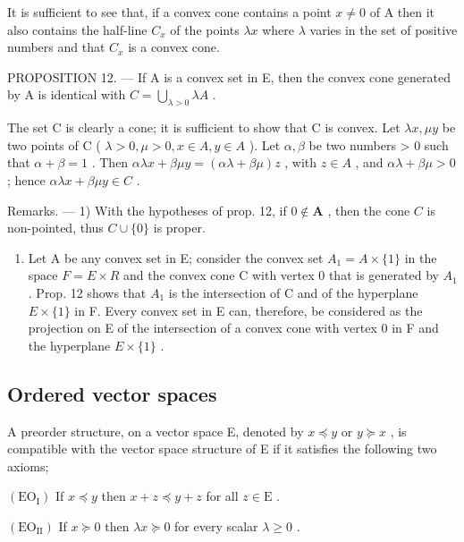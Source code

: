 It is sufficient to see that, if a convex cone contains a point \(x \neq 0\) of A then it also contains the half-line \(C_{x}\) of the points \(\lambda x\) where \(\lambda\) varies in the set of positive numbers and that \(C_{x}\) is a convex cone.

PROPOSITION 12. --- If A is a convex set in E, then the convex cone generated by A is identical with \(C = \bigcup_{\lambda > 0} \lambda A\) .

The set C is clearly a cone; it is sufficient to show that C is convex. Let \(\lambda x, \mu y\) be two points of C ( \(\lambda > 0, \mu > 0, x \in A, y \in A\) ). Let \(\alpha, \beta\) be two numbers \textgreater{} 0 such that \(\alpha + \beta = 1\) . Then \(\alpha \lambda x + \beta \mu y = (\alpha \lambda + \beta \mu) z\) , with \(z \in A\) , and \(\alpha \lambda + \beta \mu > 0\) ; hence \(\alpha \lambda x + \beta \mu y \in C\) .

Remarks. --- 1) With the hypotheses of prop. 12, if \(0 \notin \mathbf{A}\) , then the cone \(C\) is non-pointed, thus \(C \cup \{0\}\) is proper.

\begin{enumerate}
\def\labelenumi{\arabic{enumi})}
\setcounter{enumi}{1}
\tightlist
\item
  Let A be any convex set in E; consider the convex set \(A_{1} = A \times \{1\}\) in the space \(F = E \times R\) and the convex cone C with vertex 0 that is generated by \(A_{1}\) . Prop. 12 shows that \(A_{1}\) is the intersection of C and of the hyperplane \(E \times \{1\}\) in F. Every convex set in E can, therefore, be considered as the projection on E of the intersection of a convex cone with vertex 0 in F and the hyperplane \(E \times \{1\}\) .
\end{enumerate}

\subsection{Ordered vector spaces}

A preorder structure, on a vector space E, denoted by \(x \preccurlyeq y\) or \(y \succcurlyeq x\) , is compatible with the vector space structure of E if it satisfies the following two axioms;

\((\mathrm{EO}_{\mathrm{I}})\) If \(x \preccurlyeq y\) then \(x + z \preccurlyeq y + z\) for all \(z \in \mathrm{E}\) .

\((\mathrm{EO}_{\mathrm{II}})\) If \(x \succcurlyeq 0\) then \(\lambda x \succcurlyeq 0\) for every scalar \(\lambda \geqslant 0\) .


